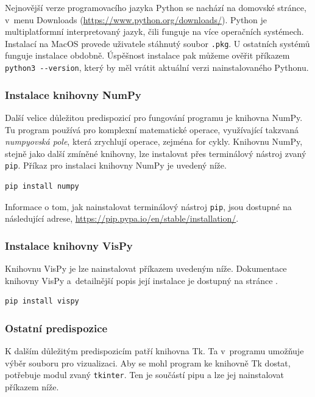 \documentclass[11pt]{article}
\begin{document}
Nejnovější verze programovacího jazyka Python se nachází na domovské stránce, v~menu Downloads (\url{https://www.python.org/downloads/}). Python je multiplatformní interpretovaný jazyk, čili funguje na více operačních systémech. Instalací na MacOS provede uživatele stáhnutý soubor \verb|.pkg|. U ostatních systémů funguje instalace obdobně. Úspěšnost instalace pak můžeme ověřit příkazem \verb|python3 --version|, který by měl vrátit aktuální verzi nainstalovaného Pythonu. 

\subsubsection{Instalace knihovny NumPy}

Další velice důležitou predispozicí pro fungování programu je knihovna NumPy. Tu program používá pro komplexní matematické operace, využívající takzvaná {\em numpyovská pole\/}, která zrychlují operace, zejména for cykly. Knihovnu NumPy, stejně jako další zmíněné knihovny, lze instalovat přes terminálový nástroj zvaný \verb|pip|. Příkaz pro instalaci knihovny NumPy je uvedený níže.

\begin{lstlisting}
pip install numpy
\end{lstlisting}

Informace o tom, jak nainstalovat terminálový nástroj \verb|pip|, jsou dostupné na následující adrese, 
\url{https://pip.pypa.io/en/stable/installation/}.

\subsubsection{Instalace knihovny VisPy}

Knihovnu VisPy je lze nainstalovat příkazem uvedeným níže. Dokumentace knihovny VisPy a~detailnější popis její instalace je dostupný na stránce \cite{vispy}.

\begin{lstlisting}
pip install vispy
\end{lstlisting}

\subsubsection{Ostatní predispozice}

K dalším důležitým predispozicím patří knihovna Tk. Ta v~programu umožňuje výběr souboru pro vizualizaci. Aby se mohl program ke knihovně Tk dostat, potřebuje modul zvaný \verb|tkinter|. Ten je součástí pipu a lze jej nainstalovat příkazem níže. 
\end{document}
